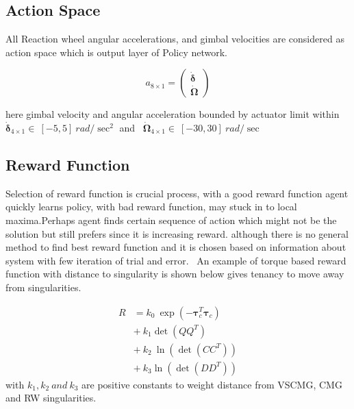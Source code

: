 \subsection{Action Space}
All Reaction wheel angular accelerations, and gimbal velocities are considered as action space which is output layer of Policy network.

\begin{equation}
a_{8\times 1} =\begin{pmatrix}
\mathbf{\dot{\delta }}\\
\mathbf{\dot{\Omega }}
\end{pmatrix}
\end{equation}


\noindent here gimbal velocity and angular acceleration bounded by actuator limit within $\displaystyle \mathbf{\dot{\delta }}_{4\times 1} \in \ [ -5,5] \ rad/\sec^{2}$ and \ $\displaystyle \mathbf{\dot{\Omega }}_{4\times 1} \in \ [ -30,30] \ rad/\sec$
\subsection{Reward Function}
Selection of reward function is crucial process, with a good reward function agent quickly learns policy, with bad reward function, may stuck in to local maxima.Perhaps agent finds certain sequence of action which might not be the solution but still prefers since it is increasing reward. although there is no general method to find best reward function and it is chosen based on information about system with few iteration of trial and error. \ An example of torque based reward function with distance to singularity is shown below gives tenancy to move away from singularities.

\begin{equation}
\begin{aligned}
R & =k_{0} \ \exp\left( -\mathbf{\tau }^{T}_{c}\mathbf{\tau }_{c}\right)\\
 & +\ k_{1}\det\left( QQ^{T}\right) \ \\
 & +\ k_{2} \ \ln\left(\det\left( CC^{T}\right)\right)\\
 & +\ k_{3}\ln\left(\det\left( DD^{T}\right)\right)
\end{aligned}
\end{equation}with $\displaystyle k_{1} ,k_{2} \ and\ k_{3}$ are positive constants to weight distance from VSCMG, CMG and RW singularities.
